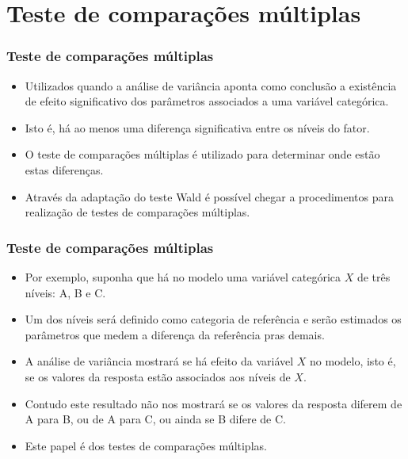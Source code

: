 \documentclass[10pt,
  aspectratio=169,
  serif,
  mathserif,
  professionalfont,
  compress,
  handout,
  ]{beamer}\usepackage[]{graphicx}\usepackage[]{color}
\begin{document}
\section{Teste de comparações múltiplas}

\begin{frame}

\frametitle{Teste de comparações múltiplas}

\begin{itemize}
    \itemsep 2ex

  \item Utilizados quando a análise de variância aponta como conclusão a existência de efeito significativo dos parâmetros associados a uma variável categórica.

  \item Isto é, há ao menos uma diferença significativa entre os níveis do fator.

  \item O teste de comparações múltiplas é utilizado para determinar onde estão estas diferenças. 
  
  \item Através da adaptação do teste Wald é possível chegar a procedimentos para realização de testes de comparações múltiplas.
  
\end{itemize}

\end{frame}


\begin{frame}

\frametitle{Teste de comparações múltiplas}

\begin{itemize}
    \itemsep 2ex

  \item Por exemplo, suponha que há no modelo uma variável categórica $X$ de três níveis: A, B e C.

  \item Um dos níveis será definido como categoria de referência e serão estimados os parâmetros que medem a diferença da referência pras demais.

  \item A análise de variância mostrará se há efeito da variável $X$ no modelo, isto é, se os valores da resposta estão associados aos níveis de $X$.
  
  \item Contudo este resultado não nos mostrará se os valores da resposta diferem de A para B, ou de A para C, ou ainda se B difere de C.
  
  \item Este papel é dos testes de comparações múltiplas.
  
\end{itemize}

\end{frame}
\end{document}
